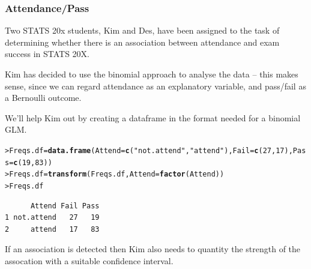 \documentclass{beamer}\usepackage[]{graphicx}\usepackage[]{xcolor}
\makeatletter
\newcommand{\hlnum}[1]{\textcolor[rgb]{0.686,0.059,0.569}{#1}}%
\newcommand{\hlstr}[1]{\textcolor[rgb]{0.192,0.494,0.8}{#1}}%
\newcommand{\hlstd}[1]{\textcolor[rgb]{0.345,0.345,0.345}{#1}}%
\newcommand{\hlkwb}[1]{\textcolor[rgb]{0.69,0.353,0.396}{#1}}%
\newcommand{\hlkwc}[1]{\textcolor[rgb]{0.333,0.667,0.333}{#1}}%
\newcommand{\hlkwd}[1]{\textcolor[rgb]{0.737,0.353,0.396}{\textbf{#1}}}%
\newenvironment{kframe}{%
 \def\at@end@of@kframe{}%
 \ifinner\ifhmode%
  \def\at@end@of@kframe{\end{minipage}}%
  \begin{minipage}{\columnwidth}%
 \fi\fi%
 \def\FrameCommand##1{\hskip\@totalleftmargin \hskip-\fboxsep
 \colorbox{shadecolor}{##1}\hskip-\fboxsep
     \hskip-\linewidth \hskip-\@totalleftmargin \hskip\columnwidth}%
 \MakeFramed {\advance\hsize-\width
   \@totalleftmargin\z@ \linewidth\hsize
   \@setminipage}}%
 {\par\unskip\endMakeFramed%
 \at@end@of@kframe}
\newenvironment{knitrout}{}{} %
\makeatother
\begin{document}
\begin{frame}[fragile]
\frametitle{Attendance/Pass}
Two STATS 20x students, Kim and Des, have been assigned to the task of determining whether there is an association between attendance and exam success in STATS 20X. 
\medskip

Kim has decided to use the binomial approach to analyse the data -- this makes sense, since we can regard attendance as an explanatory variable, and pass/fail as a Bernoulli outcome.
\medskip

We'll help Kim out by creating a dataframe in the format needed for a binomial GLM.

\begin{knitrout}\scriptsize
{}\color{fgcolor}\begin{kframe}
\begin{alltt}
\hlstd{> }\hlstd{Freqs.df} \hlkwb{=} \hlkwd{data.frame}\hlstd{(}\hlkwc{Attend}\hlstd{=}\hlkwd{c}\hlstd{(}\hlstr{"not.attend"}\hlstd{,}\hlstr{"attend"}\hlstd{),}\hlkwc{Fail}\hlstd{=}\hlkwd{c}\hlstd{(}\hlnum{27}\hlstd{,}\hlnum{17}\hlstd{),}\hlkwc{Pass}\hlstd{=}\hlkwd{c}\hlstd{(}\hlnum{19}\hlstd{,}\hlnum{83}\hlstd{))}
\hlstd{> }\hlstd{Freqs.df} \hlkwb{=} \hlkwd{transform}\hlstd{(Freqs.df,}\hlkwc{Attend}\hlstd{=}\hlkwd{factor}\hlstd{(Attend))}
\hlstd{> }\hlstd{Freqs.df}
\end{alltt}
\begin{verbatim}
      Attend Fail Pass
1 not.attend   27   19
2     attend   17   83
\end{verbatim}
\end{kframe}
\end{knitrout}
\medskip

If an association is detected then Kim also needs to quantity the strength of the assocation with a suitable confidence interval.
\medskip

\end{frame}
\end{document}
